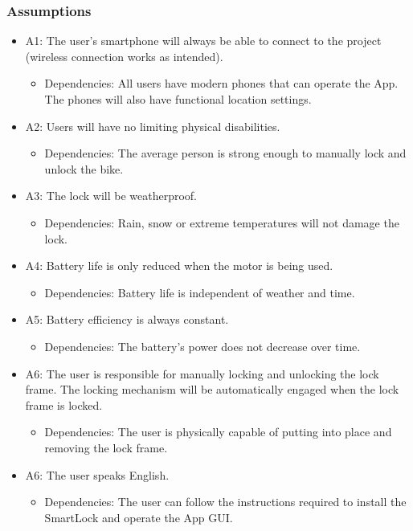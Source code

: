 \documentclass[12pt]{article}
\begin{document}
\subsubsection{Assumptions} \label{sec_assumpt}

\begin{itemize}

\item A1: The user’s smartphone will always be able to connect to the project (wireless connection works as intended).
	\begin {itemize}
		\item Dependencies: All users have modern phones that can operate the App. The phones will also have functional location settings.  
	\end {itemize}
	
\item A2: Users will have no limiting physical disabilities.
	\begin {itemize}
		\item Dependencies: The average person is strong enough to manually lock and unlock the bike.
	\end {itemize}
	
\item A3: The lock will be weatherproof.
	\begin {itemize}
		\item Dependencies: Rain, snow or extreme temperatures will not damage the lock. 
	\end {itemize}
	
\item A4: Battery life is only reduced when the motor is being used.
	\begin {itemize} 
		\item Dependencies: Battery life is independent of weather and time.
	\end {itemize}

\item A5: Battery efficiency is always constant.
	\begin {itemize}
		\item Dependencies: The battery's power does not decrease over time.
	\end {itemize}
	
\item A6: The user is responsible for manually locking and unlocking the lock frame. The locking mechanism will be automatically engaged when the lock frame is locked.
	\begin {itemize}
		\item Dependencies: The user is physically capable of putting into place and removing the lock frame.
	\end {itemize}
	
	\item A6: The user speaks English.
	\begin {itemize}
		\item Dependencies: The user can follow the instructions required to install the SmartLock and operate the App GUI.
	\end {itemize}


\end{itemize}
\end{document}
